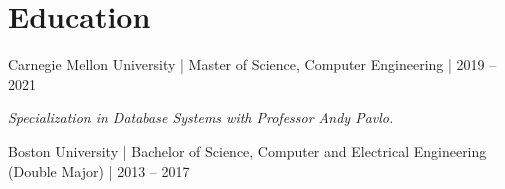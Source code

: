 \documentclass[letterpaper,11pt]{article}
\newcommand{\subline}[1]{\textit{#1}\par}
\begin{document}
\section{Education}
Carnegie Mellon University | Master of Science, Computer Engineering | 2019 -- 2021\par\vspace{3pt}
\subline{Specialization in Database Systems with Professor Andy Pavlo.}\vspace{3pt}
Boston University | Bachelor of Science, Computer and Electrical Engineering (Double Major) | 2013 -- 2017\par
\end{document}
